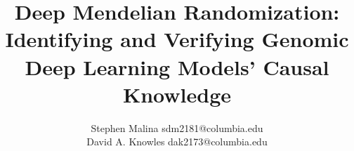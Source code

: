 \documentclass[twoside,11pt]{article}
\begin{document}
\title{Deep Mendelian Randomization: Identifying and Verifying Genomic Deep Learning Models' Causal Knowledge}

\author{\name Stephen Malina \email sdm2181@columbia.edu \\
       \AND
       \name David A. Knowles \email dak2173@columbia.edu}
       


\maketitle








\newpage

\appendix

\vskip 0.2in

\end{document}
